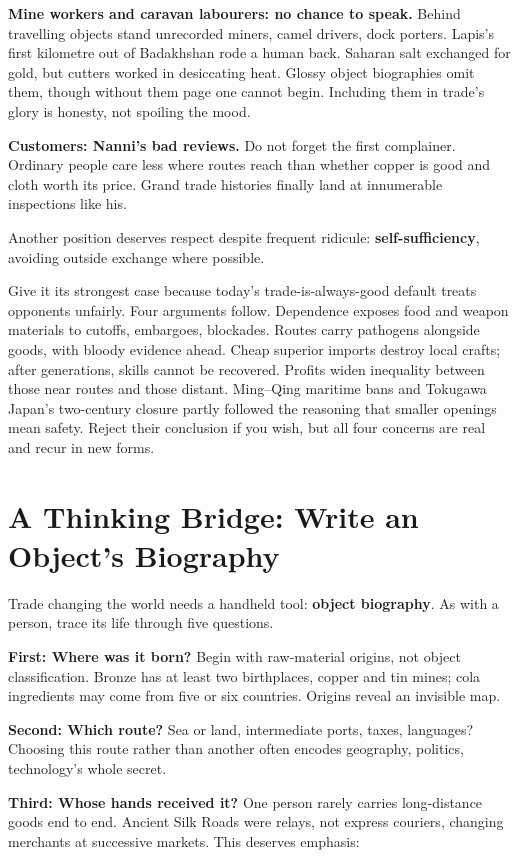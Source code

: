 \textbf{Mine workers and caravan labourers: no chance to speak.} Behind travelling objects stand unrecorded miners, camel drivers, dock porters. Lapis's first kilometre out of Badakhshan rode a human back. Saharan salt exchanged for gold, but cutters worked in desiccating heat. Glossy object biographies omit them, though without them page one cannot begin. Including them in trade's glory is honesty, not spoiling the mood.

\textbf{Customers: Nanni's bad reviews.} Do not forget the first complainer. Ordinary people care less where routes reach than whether copper is good and cloth worth its price. Grand trade histories finally land at innumerable inspections like his.

Another position deserves respect despite frequent ridicule: \textbf{self-sufficiency}, avoiding outside exchange where possible.

Give it its strongest case because today's trade-is-always-good default treats opponents unfairly. Four arguments follow. Dependence exposes food and weapon materials to cutoffs, embargoes, blockades. Routes carry pathogens alongside goods, with bloody evidence ahead. Cheap superior imports destroy local crafts; after generations, skills cannot be recovered. Profits widen inequality between those near routes and those distant. Ming--Qing maritime bans and Tokugawa Japan's two-century closure partly followed the reasoning that smaller openings mean safety. Reject their conclusion if you wish, but all four concerns are real and recur in new forms.

\section[Thinking Bridge: An Object's Biography]{A Thinking Bridge: Write an Object's Biography}
Trade changing the world needs a handheld tool: \textbf{object biography}. As with a person, trace its life through five questions.

\textbf{First: Where was it born?} Begin with raw-material origins, not object classification. Bronze has at least two birthplaces, copper and tin mines; cola ingredients may come from five or six countries. Origins reveal an invisible map.

\textbf{Second: Which route?} Sea or land, intermediate ports, taxes, languages? Choosing this route rather than another often encodes geography, politics, technology's whole secret.

\textbf{Third: Whose hands received it?} One person rarely carries long-distance goods end to end. Ancient Silk Roads were relays, not express couriers, changing merchants at successive markets. This deserves emphasis:

